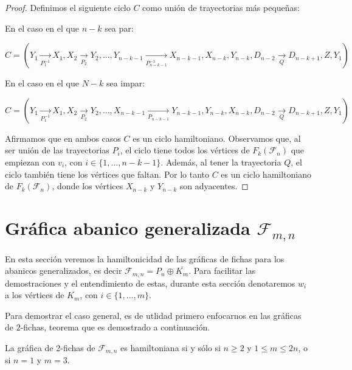 \begin{proof}
            Definimos el siguiente ciclo $C$ como uni\'on de trayectorias m\'as
            peque\~{n}as: 
    
            En el caso en el que $n-k$ sea par:
            
            $C =(Y_1 \xrightarrow[P_1^{-1}]{} X_1, X_2 \xrightarrow[P_2]{} Y_2,
            \dots, Y_{n-k-1} \xrightarrow[P_{n-k-1}^{-1}]{} X_{n-k-1}, X_{n-k},
            Y_{n-k}, D_{n-2} \xrightarrow[Q]{} D_{n-k+1}, Z, Y_1)$
    
            En el caso en el que $N-k$ sea impar:
    
            $C = (Y_1 \xrightarrow[P_1^{-1}]{} X_1, X_2 \xrightarrow[P_2]{} Y_2,
            \dots, X_{n-k-1} \xrightarrow[P_{n-k-1}]{} Y_{n-k-1}, Y_{n-k},
            X_{n-k}, D_{n-2} \xrightarrow[Q]{} D_{n-k+1}, Z, Y_1)$
    
            Afirmamos que en ambos casos $C$ es un ciclo hamiltoniano.
            Observamos que, al ser uni\'on de las trayectorias $P_i$, el ciclo
            tiene todos los v\'ertices de $F_k(\mathcal{F}_n)$ que empiezan con $v_i$, con
            $i \in \{1, \dots, n-k-1\}$. Adem\'as, al tener la trayectoria $Q$,
            el ciclo tambi\'en tiene los v\'ertices que faltan. Por lo tanto $C$
            es un ciclo hamiltoniano de $F_k(\mathcal{F}_n)$, donde los v\'ertices
            $X_{n-k}$ y $Y_{n-k}$ son adyacentes. 
    
        \end{proof}

\section{Gr\'afica abanico generalizada $\mathcal{F}_{m,n}$}%
\label{sec:GeneralFan}

En esta secci\'on veremos la hamiltonicidad de las gr\'aficas de fichas para los
abanicos generalizados, es decir $\mathcal{F}_{m,n}=P_n \oplus \overline{K_m}$.
Para facilitar las demostraciones y el entendimiento de estas, durante esta
secci\'on denotaremos $w_i$ a los v\'ertices de $\overline{K_m}$, con $i \in
\{1, \dots, m\}$. 

Para demostrar el caso general, es de utlidad primero enfocarnos en las
gr\'aficas de $2$-fichas, teorema que es demostrado a continuaci\'on.

\begin{teorema}
\label{teo:2-TokGenerFan}
    La gr\'afica de 2-fichas de $\mathcal{F}_{m,n}$ es hamiltoniana si y s\'olo si $n \geq
    2$ y $1 \leq m \leq 2n$, o si $n=1$ y $m=3$.
\end{teorema}

